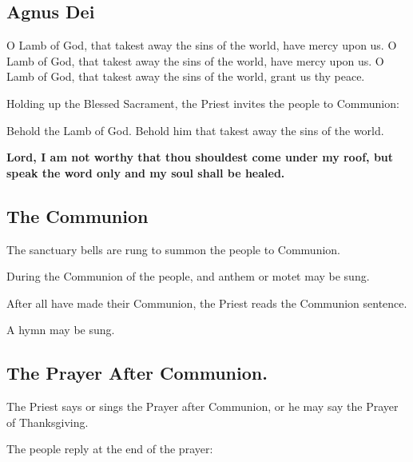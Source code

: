 
\subsection{Agnus Dei}

O Lamb of God, that takest away the sins of the world, have mercy upon us.
O Lamb of God, that takest away the sins of the world, have mercy upon us.
O Lamb of God, that takest away the sins of the world, grant us thy peace.

\begin{rubric}
Holding up the Blessed Sacrament, the Priest invites the people to Communion:
\end{rubric}

Behold the Lamb of God. Behold him that takest away the sins of the world.

\textbf{Lord, I am not worthy that thou shouldest come under my roof, but
speak the word only and my soul shall be healed.}

\newpage

\subsection{The Communion}

\begin{rubric}
The sanctuary bells are rung to summon the people to Communion.

During the Communion of the people, and anthem or motet may be sung.

After all have made their Communion, the Priest reads the Communion sentence.

A hymn may be sung.
\end{rubric}

\subsection{The Prayer After Communion.}

\begin{rubric}
The Priest says or sings the Prayer after Communion, or he may say the Prayer of Thanksgiving.
\end{rubric}



\begin{rubric}
The people reply at the end of the prayer: 
\end{rubric}


